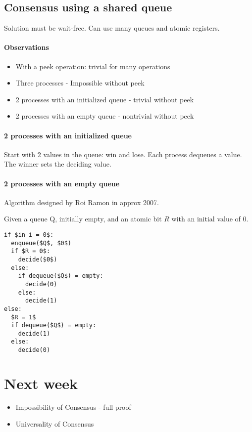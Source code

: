 \documentclass{idc_msc}
\begin{document}
\subsection{Consensus using a shared queue}

Solution must be wait-free.
Can use many queues and atomic registers.

\paragraph{Observations}

\begin{itemize}
  \item With a peek operation: trivial for many operations
  \item Three processes - Impossible without peek
  \item 2 processes with an initialized queue - trivial without peek
  \item 2 processes with an empty queue - nontrivial without peek
\end{itemize}

\paragraph{2 processes with an initialized queue}

Start with 2 values in the queue: win and lose.
Each process dequeues a value. The winner sets the deciding value.

\paragraph{2 processes with an empty queue}

Algorithm designed by Roi Ramon in approx 2007.

Given a queue Q, initially empty, and an atomic bit $R$ with an initial value of $0$.

\begin{lstlisting}[frame=L,mathescape=true,title={For processes $i=1...n$}]
if $in_i = 0$:
  enqueue($Q$, $0$)
  if $R = 0$:
    decide($0$)
  else:
    if dequeue($Q$) = empty:
      decide(0)
    else:
      decide(1)
else:
  $R = 1$
  if dequeue($Q$) = empty:
    decide(1)
  else:
    decide(0)
\end{lstlisting}

\section{Next week}

\begin{itemize}
  \item Impossibility of Consensus - full proof
  \item Universality of Consensus
\end{itemize}
\end{document}
